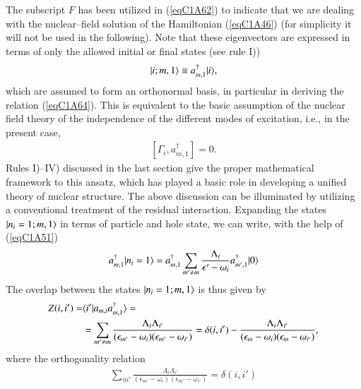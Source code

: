  
The subscript $F$ has been utilized in (\ref{eqC1A62}) to indicate that we are dealing with the nuclear--field solution of the Hamiltonian (\ref{eqC1A46}) (for simplicity it will not be used in the following). Note that these eigenvectors are expressed in terms of only the allowed initial or final states (see rule I)) 
\begin{align}\label{eqC1A65} 
 |{i;m,1} \rangle\equiv a^\dagger_{m,1}|{i} \rangle,
  \end{align}
which are assumed to form an orthonormal basis, in particular in deriving the 
relation (\ref{eqC1A64}). This is equivalent to the basic assumption of the nuclear field theory of the independence of the different modes of excitation, i.e., in the 
present case, 
\begin{align}\label{eqC1A66} 
 [\Gamma_i,a^\dagger_{m,1}]=0.
  \end{align}
Rules I)--IV) discussed in the last section give the proper mathematical framework to this ansatz, which has played a basic role in developing a unified theory of nuclear structure. 
The above discussion can be illuminated by utilizing a conventional treatment of the residual interaction. Expanding the states $|{n_i=1; m,1} \rangle$
in terms of particle and hole state, we can write, with the help of (\ref{eqC1A51}) 
\begin{align}\label{eqC1A66b} 
 a^\dagger_{m,1}|{n_i=1} \rangle=a^\dagger_{m,1}\sum_{m'\neq m}\frac{\Lambda_i}{\epsilon'-\omega_i}a^\dagger_{m',1}|{0} \rangle
  \end{align}
The overlap between the states $|{n_i=1; m,1} \rangle$ is thus given by 
\begin{align}\label{eqC1A67} 
 \nonumber Z(i,i')=&\langle {i'|a_{m,i}a^\dagger_{m,1}} \rangle=\\
 &=\sum_{m'\neq m}\frac{\Lambda_i\Lambda_{i'}}{(\epsilon_{m'}-\omega_i)(\epsilon_{m'}-\omega_{i'})}=\delta(i,i')-\frac{\Lambda_i\Lambda_{i'}}{(\epsilon_m-\omega_i)(\epsilon_m-\omega_{i'})},
  \end{align}
where the orthogonality relation 
\begin{align}\label{eqC1A68} 
 \sum_{m'}\frac{\Lambda_i\Lambda_{i'}}{(\epsilon_{m'}-\omega_i)(\epsilon_{m'}-\omega_{i'})}=\delta(i,i')
  \end{align}


